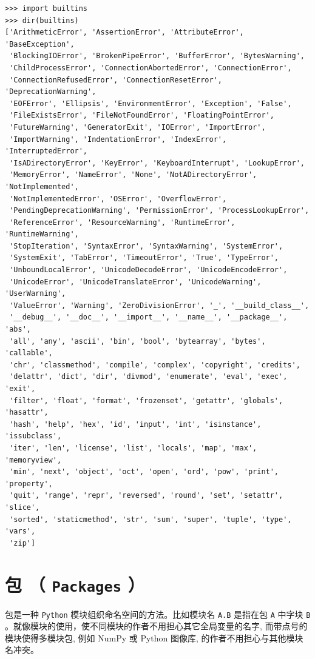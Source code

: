\documentclass[10pt,a4paper,UTF8]{article}
\begin{document}
\begin{verbatim}
>>> import builtins
>>> dir(builtins)  
['ArithmeticError', 'AssertionError', 'AttributeError', 'BaseException',
 'BlockingIOError', 'BrokenPipeError', 'BufferError', 'BytesWarning',
 'ChildProcessError', 'ConnectionAbortedError', 'ConnectionError',
 'ConnectionRefusedError', 'ConnectionResetError', 'DeprecationWarning',
 'EOFError', 'Ellipsis', 'EnvironmentError', 'Exception', 'False',
 'FileExistsError', 'FileNotFoundError', 'FloatingPointError',
 'FutureWarning', 'GeneratorExit', 'IOError', 'ImportError',
 'ImportWarning', 'IndentationError', 'IndexError', 'InterruptedError',
 'IsADirectoryError', 'KeyError', 'KeyboardInterrupt', 'LookupError',
 'MemoryError', 'NameError', 'None', 'NotADirectoryError', 'NotImplemented',
 'NotImplementedError', 'OSError', 'OverflowError',
 'PendingDeprecationWarning', 'PermissionError', 'ProcessLookupError',
 'ReferenceError', 'ResourceWarning', 'RuntimeError', 'RuntimeWarning',
 'StopIteration', 'SyntaxError', 'SyntaxWarning', 'SystemError',
 'SystemExit', 'TabError', 'TimeoutError', 'True', 'TypeError',
 'UnboundLocalError', 'UnicodeDecodeError', 'UnicodeEncodeError',
 'UnicodeError', 'UnicodeTranslateError', 'UnicodeWarning', 'UserWarning',
 'ValueError', 'Warning', 'ZeroDivisionError', '_', '__build_class__',
 '__debug__', '__doc__', '__import__', '__name__', '__package__', 'abs',
 'all', 'any', 'ascii', 'bin', 'bool', 'bytearray', 'bytes', 'callable',
 'chr', 'classmethod', 'compile', 'complex', 'copyright', 'credits',
 'delattr', 'dict', 'dir', 'divmod', 'enumerate', 'eval', 'exec', 'exit',
 'filter', 'float', 'format', 'frozenset', 'getattr', 'globals', 'hasattr',
 'hash', 'help', 'hex', 'id', 'input', 'int', 'isinstance', 'issubclass',
 'iter', 'len', 'license', 'list', 'locals', 'map', 'max', 'memoryview',
 'min', 'next', 'object', 'oct', 'open', 'ord', 'pow', 'print', 'property',
 'quit', 'range', 'repr', 'reversed', 'round', 'set', 'setattr', 'slice',
 'sorted', 'staticmethod', 'str', 'sum', 'super', 'tuple', 'type', 'vars',
 'zip']
\end{verbatim}
\section{包 （ \texttt{Packages} ）}
\label{sec:orgac16391}


包是一种 \texttt{Python}  模块组织命名空间的方法。比如模块名 \texttt{A.B} 是指在包 \texttt{A} 中字块 \texttt{B} 。就像模块的使用，使不同模块的作者不用担心其它全局变量的名字, 而带点号的模块使得多模块包, 例如 NumPy 或 Python 图像库, 的作者不用担心与其他模块名冲突。
\end{document}
